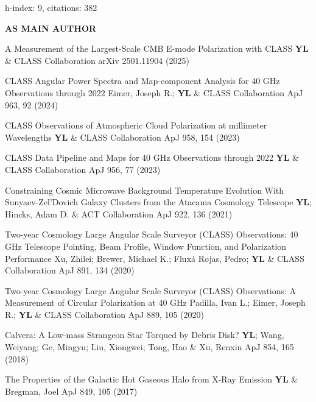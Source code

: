 \hfill\textmd{h-index: 9, citations: 382}
\begin{footnotesize}
    \textsf{\textbf{ AS MAIN AUTHOR }}
\end{footnotesize}
\begin{etaremune}[topsep=0pt,itemsep=0pt,partopsep=0pt,parsep=0pt]
    \renewcommand\labelenumi{\footnotesize\bfseries\theenumi.}
    
            {A Measurement of the Largest-Scale CMB E-mode Polarization with CLASS}
            {\textbf{YL} \& CLASS Collaboration}
            {arXiv 2501.11904 (2025)}
    
            {CLASS Angular Power Spectra and Map-component Analysis for 40 GHz Observations through 2022}
            {Eimer, Joseph R.; \textbf{YL} \& CLASS Collaboration}
            {ApJ 963, 92 (2024)}
    
            {CLASS Observations of Atmospheric Cloud Polarization at millimeter Wavelengths}
            {\textbf{YL} \& CLASS Collaboration}
            {ApJ 958, 154 (2023)}
    
            {CLASS Data Pipeline and Maps for 40 GHz Observations through 2022}
            {\textbf{YL} \& CLASS Collaboration}
            {ApJ 956, 77 (2023)}
    
            {Constraining Cosmic Microwave Background Temperature Evolution With Sunyaev-Zel'Dovich Galaxy Clusters from the Atacama Cosmology Telescope}
            {\textbf{YL}; Hincks, Adam D. \& ACT Collaboration}
            {ApJ 922, 136 (2021)}
    
            {Two-year Cosmology Large Angular Scale Surveyor (CLASS) Observations: 40 GHz Telescope Pointing, Beam Profile, Window Function, and Polarization Performance}
            {Xu, Zhilei; Brewer, Michael K.; Fluxá Rojas, Pedro; \textbf{YL} \& CLASS Collaboration}
            {ApJ 891, 134 (2020)}
    
            {Two-year Cosmology Large Angular Scale Surveyor (CLASS) Observations: A Measurement of Circular Polarization at 40 GHz}
            {Padilla, Ivan L.; Eimer, Joseph R.; \textbf{YL} \& CLASS Collaboration}
            {ApJ 889, 105 (2020)}
    
            {Calvera: A Low-mass Strangeon Star Torqued by Debris Disk?}
            {\textbf{YL}; Wang, Weiyang; Ge, Mingyu; Liu, Xiongwei; Tong, Hao \& Xu, Renxin}
            {ApJ 854, 165 (2018)}
    
            {The Properties of the Galactic Hot Gaseous Halo from X-Ray Emission}
            {\textbf{YL} \& Bregman, Joel}
            {ApJ 849, 105 (2017)}
    
\end{etaremune}
